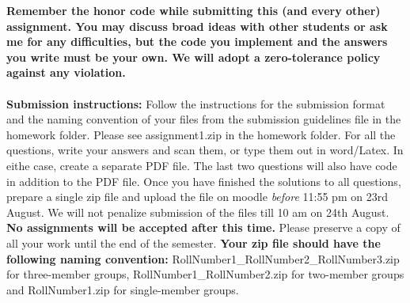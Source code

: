 \documentclass[11pt]{article}
\begin{document}
\maketitle

\textbf{Remember the honor code while submitting this (and every other) assignment. You may discuss broad ideas with other students or ask me for any difficulties, but the code you implement and the answers you write must be your own. We will adopt a \textbf{zero-tolerance policy} against any violation.}
\\
\\
\textbf{Submission instructions:} Follow the instructions for the submission format and the naming convention of your files from the submission guidelines file in the homework folder. Please see \textsf{assignment1.zip} in the homework folder. For all the questions, write your answers and scan them, or type them out in word/Latex. In eithe case, create a separate PDF file. The last two questions will also have code in addition to the PDF file. Once you have finished the solutions to all questions, prepare a single zip file and upload the file on moodle \emph{before} 11:55 pm on 23rd August.  We will not penalize submission of the files till 10 am on 24th August. \textbf{No assignments will be accepted after this time.} Please preserve a copy of all your work until the end of the semester.  \textbf{Your zip file should have the following naming convention:} RollNumber1\_RollNumber2\_RollNumber3.zip for three-member groups, RollNumber1\_RollNumber2.zip for two-member groups and RollNumber1.zip for single-member groups. 
\end{document}

